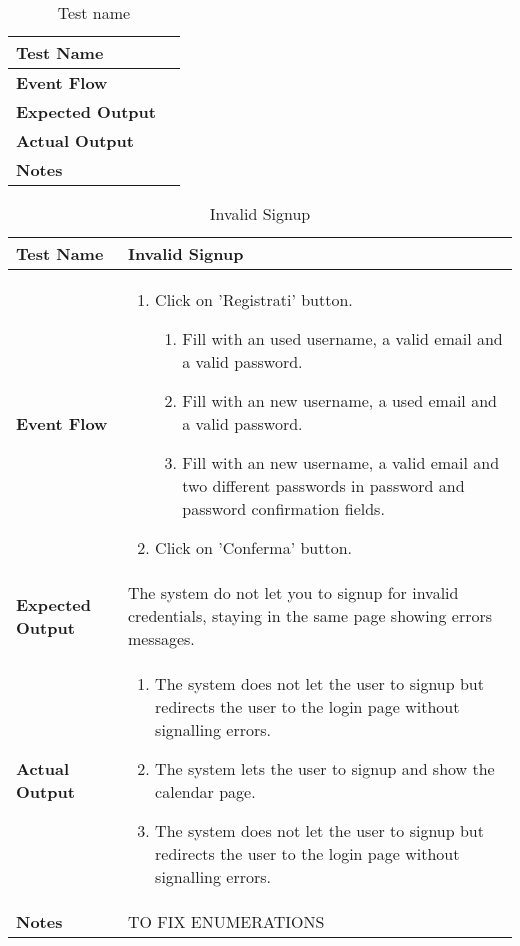 \begin{table}[h]	
	\centering
	\def\arraystretch{1.5}
	\begin{tabular}{|m{7cm}|m{7cm}|}
		\hline
		\textbf{Test Name}            &    \\ \hline
		\textbf{Event Flow}             &   \\ \hline
		\textbf{Expected Output}  &     \\ \hline
		\textbf{Actual Output}       &     \\ \hline
		\textbf{Notes} & \\ \hline
	\end{tabular}
	\caption{Test name}
\end{table}


\begin{table}[h]	
	\centering
	\def\arraystretch{1.5}
	\begin{tabular}{|m{7cm}|m{7cm}|}
		\hline
		\textbf{Test Name}            &  Invalid Signup  \\ \hline
		\textbf{Event Flow}             &  
		\begin{enumerate}
			\item Click on 'Registrati' button.
			\begin{enumerate}
				\item Fill with an used username, a valid email and a valid password.
				\item Fill with an new username, a used email and a valid password.
				\item Fill with an new username, a valid email and two different passwords in password and password confirmation fields.
			\end{enumerate}
		\item Click on 'Conferma' button.
		\end{enumerate} \\ \hline
		\textbf{Expected Output}  &  The system do not let you to signup for invalid credentials, staying in the same page showing errors messages.   \\ \hline
		\textbf{Actual Output}       & 
		\begin{enumerate}[label=\Alph*]
			\item The system does not let the user to signup but redirects the user to the login page without signalling errors.
			\item The system lets the user to signup and show the calendar page.
			\item The system does not let the user to signup but redirects the user to the login page without signalling errors.
		\end{enumerate}    \\ \hline
		\textbf{Notes} &  TO FIX ENUMERATIONS \\ \hline
	\end{tabular}
	\caption{Invalid Signup}
\end{table}


